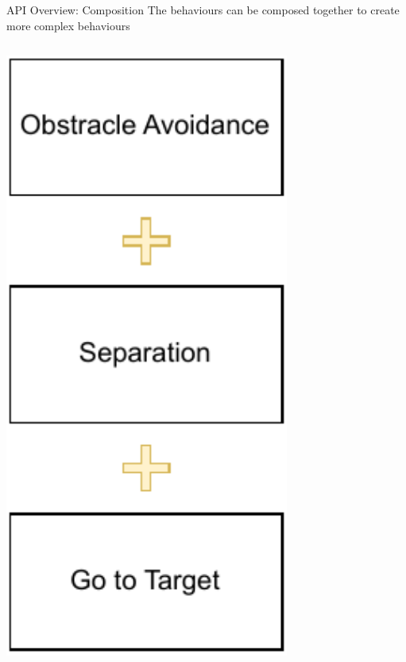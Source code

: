 \documentclass[presentation, 9pt]{beamer}\mode<presentation>{\usetheme{AMSBolognaFC}}
\begin{document}
\begin{frame}[fragile]{API Overview: Composition}
The behaviours can be composed together to create more complex behaviours
\vspace{0.4cm}
\begin{columns}
\begin{column}{0.3\textwidth}
\includegraphics[width=0.7\textwidth]{img/swarm-composition.drawio.pdf}
\end{column}


\end{columns}
\end{frame}
\end{document}
